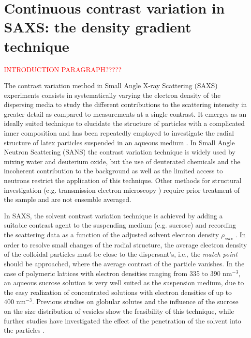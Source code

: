 \chapter{Continuous contrast variation in SAXS: the density gradient technique}
\label{chap:density_gradient_SAXS}
\textcolor{red}{INTRODUCTION PARAGRAPH?????}

The contrast variation method in Small Angle X-ray Scattering (SAXS) experiments consists in systematically varying the electron density of the dispersing media to study the different contributions to the scattering intensity in greater detail as compared to measurements at a single contrast. It emerges as an ideally suited technique to elucidate the structure of particles with a complicated inner composition and has been repeatedly employed to investigate the radial structure of latex particles suspended in an aqueous medium \citet{dingenouts_analysis_1999,ballauff_analysis_2011}. In Small Angle Neutron Scattering (SANS) the contrast variation technique is widely used by mixing water and deuterium oxide, but the use of deuterated chemicals and the incoherent contribution to the background as well as the limited access to neutrons restrict the application of this technique. Other methods for structural investigation (e.g. transmission electron microscopy \citet{joensson_morphology_1991,silverstein_microstructure_1989}) require prior treatment of the sample and are not ensemble averaged. 

In SAXS, the solvent contrast variation technique is achieved by adding a suitable contrast agent to the suspending medium (e.g. sucrose) and recording the scattering data as a function of the adjusted solvent electron density \( \rho_{solv} \) \citet{ballauff_saxs_2001-1,bolze_application_2003}. In order to resolve small changes of the radial structure, the average electron density of the colloidal particles must be close to the dispersant's, i.e., the \emph{match point} should be approached, where the average contrast of the particle vanishes. In the case of polymeric lattices with electron densities ranging from 335 to \(390 \mbox{ nm}^{-3}\), an aqueous sucrose solution is very well suited as the suspension medium, due to the easy realization of concentrated solutions with electron densities of up to \(400 \mbox{ nm}^{-3}\). Previous studies on globular solutes \citet{kawaguchi_isoscattering_1992} and the influence of the sucrose on the size distribution of vesicles \citet{kiselev_sucrose_2001-1} show the feasibility of this technique, while further studies have investigated the effect of the penetration of the solvent into the particles \citet{kawaguchi_isoscattering_1993}.

